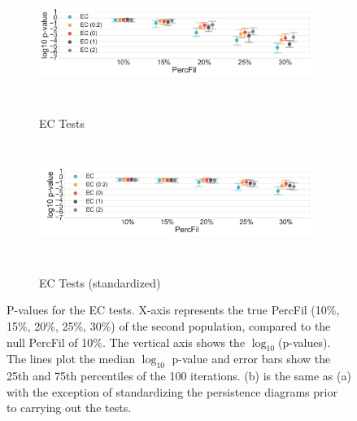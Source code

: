 \documentclass[12pt]{article}
\begin{document}
\begin{figure}[htp!]
  \centering
  \begin{subfigure}{.9\textwidth}
    \centering
    \caption{EC Tests}
    \includegraphics[width=\linewidth, height = 1.5in]{figure_8_euler_group.pdf}
    \label{fig:sub_euler}
  \end{subfigure}
  \begin{subfigure}{.9\textwidth}
    \centering
    \caption{EC Tests (standardized)}
    \includegraphics[width=\linewidth, height = 1.5in]{figure_8_euler_group_normed.pdf}
    \label{fig:sub_euler_normed}
  \end{subfigure}
\caption{P-values for the EC tests. X-axis represents the true PercFil (10\%, 15\%, 20\%, 25\%, 30\%) of the second population, compared to the null PercFil of 10\%.
The vertical axis shows the $\log_{10}$(p-values). The lines plot the median $\log_{10}$ p-value and error bars show the 25th and 75th percentiles of the 100 iterations. (b) is the same as (a) with the exception of standardizing the persistence diagrams prior to carrying out the tests. }
\label{fig:sub_euler_results}
\end{figure}
\end{document}
